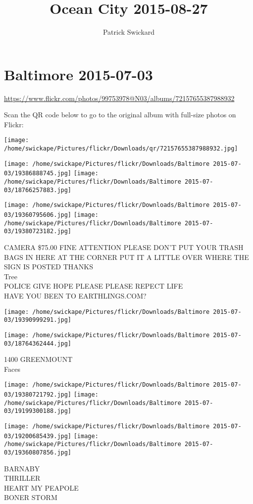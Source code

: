 \documentclass[10pt,letterpaper]{article}
\title{Ocean City 2015-08-27}
\author{Patrick Swickard}
\date{}
\begin{document}
\section*{Baltimore 2015-07-03}

\url{https://www.flickr.com/photos/99753978@N03/albums/72157655387988932}

Scan the QR code below to go to the original album with full-size photos on Flickr:

\texttt{[image: /home/swickape/Pictures/flickr/Downloads/qr/72157655387988932.jpg]}
\pagebreak

\texttt{[image: /home/swickape/Pictures/flickr/Downloads/Baltimore 2015-07-03/19386888745.jpg]}
\texttt{[image: /home/swickape/Pictures/flickr/Downloads/Baltimore 2015-07-03/18766257883.jpg]}

\texttt{[image: /home/swickape/Pictures/flickr/Downloads/Baltimore 2015-07-03/19360795606.jpg]}
\texttt{[image: /home/swickape/Pictures/flickr/Downloads/Baltimore 2015-07-03/19380723182.jpg]}

CAMERA \$75.00 FINE ATTENTION PLEASE DON'T PUT YOUR TRASH BAGS IN HERE AT THE CORNER PUT IT A LITTLE OVER WHERE THE SIGN IS POSTED THANKS\\
Tree\\
POLICE GIVE HOPE PLEASE PLEASE REPECT LIFE\\
HAVE YOU BEEN TO EARTHLINGS.COM?
\pagebreak

\texttt{[image: /home/swickape/Pictures/flickr/Downloads/Baltimore 2015-07-03/19390999291.jpg]}

\vspace{0.25in}
\texttt{[image: /home/swickape/Pictures/flickr/Downloads/Baltimore 2015-07-03/18764362444.jpg]}

1400 GREENMOUNT\\
Faces
\pagebreak

\texttt{[image: /home/swickape/Pictures/flickr/Downloads/Baltimore 2015-07-03/19380721792.jpg]}
\texttt{[image: /home/swickape/Pictures/flickr/Downloads/Baltimore 2015-07-03/19199300188.jpg]}

\texttt{[image: /home/swickape/Pictures/flickr/Downloads/Baltimore 2015-07-03/19200685439.jpg]}
\texttt{[image: /home/swickape/Pictures/flickr/Downloads/Baltimore 2015-07-03/19360807856.jpg]}

BARNABY\\
THRILLER\\
HEART MY PEAPOLE\\
BONER STORM
\pagebreak
\end{document}
